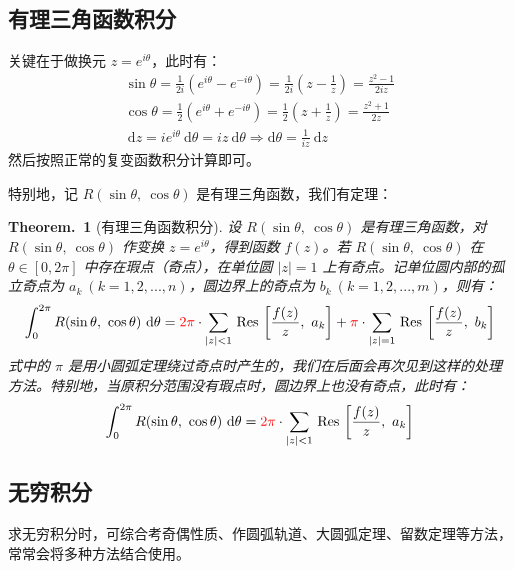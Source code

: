 \documentclass[UTF8]{report}
\def\Res{\mathrm{\,Res\,}}
\theoremstyle{MyLineTheoremStyle} %
\theoremstyle{MyBlockTheoremStyle} %
\newtheorem{BlockTheorem}[LineTheorem]{Theorem.\,} %
\theoremstyle{MySubsubsectionStyle} %
\begin{document}
\subsection{有理三角函数积分}

关键在于做换元 $z = e^{i \theta}$，此时有：
\begin{gather}
\sin \theta = \frac{1}{2i}\left( e^{i \theta} - e^{-i \theta} \right) = \frac{1}{2i}\left( z - \frac{1}{z} \right) =\frac{z^2 - 1}{2iz} \\
\cos \theta = \frac{1}{2}\left( e^{i \theta} + e^{-i \theta} \right) = \frac{1}{2}\left( z + \frac{1}{z} \right) =\frac{z^2 + 1}{2z} \\
\ \mathrm{d} z = i e^{i \theta} \ \mathrm{d} \theta = i z \ \mathrm{d} \theta \Longrightarrow \mathrm{d} \theta = \frac{1}{iz}\ \mathrm{d} z
\end{gather}
然后按照正常的复变函数积分计算即可。

特别地，记 $R(\sin \theta,\ \cos \theta)$ 是有理三角函数，我们有定理：

\begin{BlockTheorem}[有理三角函数积分]\label{有理三角函数积分}
设 $R(\sin \theta,\ \cos \theta)$ 是有理三角函数，对 $R(\sin \theta,\ \cos \theta)$ 作变换 $z = e^{i \theta}$，得到函数 $f(z)$。若 $R(\sin \theta,\ \cos \theta)$ 在 $\theta \in [0, 2\pi]$ 中存在瑕点（奇点），在单位圆 $| z |  = 1$ 上有奇点。记单位圆内部的孤立奇点为 $a_k\ (k =  1, 2, ..., n)$，圆边界上的奇点为 $b_k\ (k =  1, 2, ..., m)$，则有：
\begin{equation}
\int_{0}^{2\pi} R(\sin \theta,\ \cos \theta) \ \mathrm{d} \theta = {\color{red} 2 \pi} \cdot \sum_{| z | < 1} \Res \left[ \frac{f(z)}{z},\ a_k \right] + {\color{red} \pi} \cdot \sum_{| z | = 1} \Res \left[ \frac{f(z)}{z},\ b_k \right]
\end{equation}
式中的 $\pi$ 是用小圆弧定理绕过奇点时产生的，我们在后面会再次见到这样的处理方法。特别地，当原积分范围没有瑕点时，圆边界上也没有奇点，此时有：
\begin{equation}
    \int_{0}^{2\pi} R(\sin \theta,\ \cos \theta) \ \mathrm{d} \theta = {\color{red} 2 \pi} \cdot \sum_{| z | < 1} \Res \left[ \frac{f(z)}{z},\ a_k \right] 
\end{equation}

\end{BlockTheorem}


\subsection{无穷积分}
求无穷积分时，可综合考奇偶性质、作圆弧轨道、大圆弧定理、留数定理等方法，常常会将多种方法结合使用。
\end{document}
